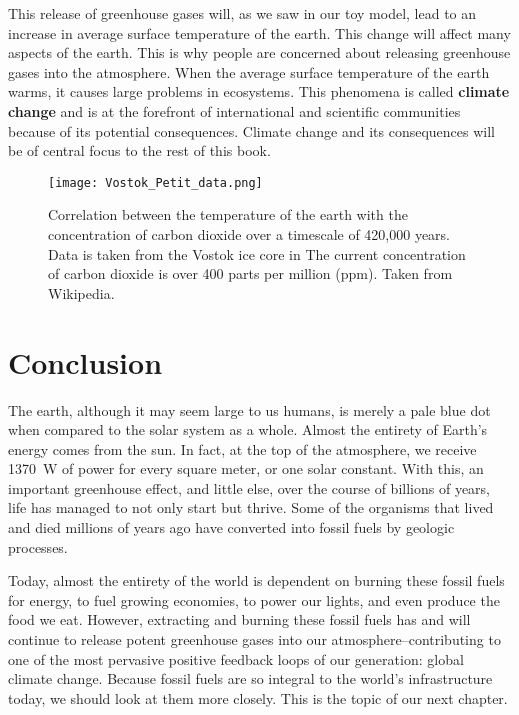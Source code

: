 This release of greenhouse gases will, as we saw in our toy model, lead to an increase in average surface temperature of the earth. This change will affect many aspects of the earth.  This is why people are concerned about releasing greenhouse gases into the atmosphere. When the average surface temperature of the earth warms, it causes large problems in ecosystems. This phenomena is called \textbf{climate change} and is at the forefront of international and scientific communities because of its potential consequences. Climate change and its consequences will be of central focus to the rest of this book.

\begin{figure}[hb!]
    \centering
    \texttt{[image: Vostok\_Petit\_data.png]}
    \caption{Correlation between the temperature of the earth with the concentration of carbon dioxide over a timescale of 420,000 years. Data is taken from the Vostok ice core in  The current concentration of carbon dioxide is over 400 parts per million (ppm). Taken from Wikipedia.}
    \label{fig:ice_core}
\end{figure}



\section{Conclusion} %
\label{sec:conclusion}

The earth, although it may seem large to us humans, is merely a pale blue dot when compared to the solar system as a whole. Almost the entirety of Earth's energy comes from the sun. In fact, at the top of the atmosphere, we receive \SI{1370}{\watt} of power for every square meter, or one solar constant. With this, an important greenhouse effect, and little else, over the course of billions of years, life has managed to not only start but thrive. Some of the organisms that lived and died millions of years ago have converted into fossil fuels  by geologic processes. 

Today, almost the entirety of the world is dependent on burning these fossil fuels for energy, to fuel growing economies, to power our lights, and even produce the food we eat. However, extracting and burning these fossil fuels has and will continue to release potent greenhouse gases into our atmosphere--contributing to one of the most pervasive positive feedback loops of our generation: global climate change. Because fossil fuels are so integral to the world's infrastructure today, we should look at them more closely. This is the topic of our next chapter.

